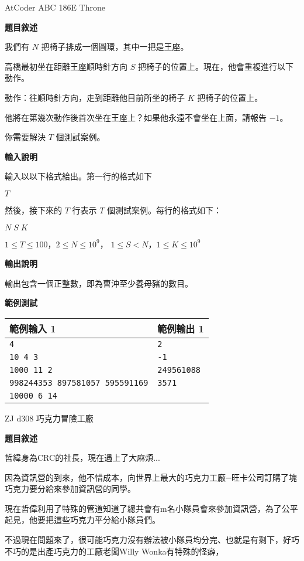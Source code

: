     \problem AtCoder ABC 186E Throne

    \textbf{題目敘述}

    我們有 $N$ 把椅子排成一個圓環，其中一把是王座。

    高橋最初坐在距離王座順時針方向 $S$ 把椅子的位置上。現在，他會重複進行以下動作。

    動作：往順時針方向，走到距離他目前所坐的椅子 $K$ 把椅子的位置上。

    他將在第幾次動作後首次坐在王座上？如果他永遠不會坐在上面，請報告 $-1$。

    你需要解決 $T$ 個測試案例。

    \textbf{輸入說明}

    輸入以以下格式給出。第一行的格式如下

    $T$

    然後，接下來的 $T$ 行表示 $T$ 個測試案例。每行的格式如下：

    $N \; S \; K$

    $1 \leq T \leq 100$，$2 \leq N \leq 10^9$，
    $1 \leq S < N$，$1 \leq K \leq 10^9$

    \textbf{輸出說明}

    輸出包含一個正整數，即為曹沖至少養母豬的數目。

    \textbf{範例測試}

    \begin{tabular}{|m{7cm}|m{7cm}|}
        \hline
        範例輸入 1 & 範例輸出 1 \\
        \hline
        \verb|4| & \verb|2| \\
        \verb|10 4 3| & \verb|-1| \\
        \verb|1000 11 2| & \verb|249561088| \\
        \verb|998244353 897581057 595591169| & \verb|3571| \\
        \verb|10000 6 14| & \\
        \hline
    \end{tabular}

    \problem ZJ d308 巧克力冒險工廠

    \textbf{題目敘述}

    哲緯身為CRC的社長，現在遇上了大麻煩...

    因為資訊營的到來，他不惜成本，向世界上最大的巧克力工廠─旺卡公司訂購了塊巧克力要分給來參加資訊營的同學。

    現在哲偉利用了特殊的管道知道了總共會有m名小隊員會來參加資訊營，為了公平起見，他要把這些巧克力平分給小隊員們。

    不過現在問題來了，很可能巧克力沒有辦法被小隊員均分完、也就是有剩下，好巧不巧的是出產巧克力的工廠老闆Willy Wonka有特殊的怪癖，

